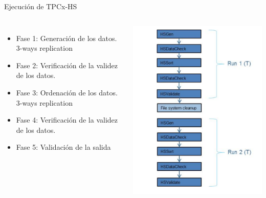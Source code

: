 		\begin{frame}{Ejecución de TPCx-HS}
				\begin{columns}[c]
						\fontsize{8}{10}\selectfont
											
						\begin{itemize}
							\item Fase 1: Generación de los datos. \\ 3-ways replication
							\item Fase 2: Verificación de la validez de los datos.
							\item Fase 3: Ordenación de los datos.  \\ 3-ways replication
							\item Fase 4: Verificación de la validez de los datos.
							\item Fase 5: Validación de la salida
						\end{itemize}
					
						\includegraphics[width=\textwidth]{./Images/executionsTPC.png}
				\end{columns}
	
		\end{frame}
		
